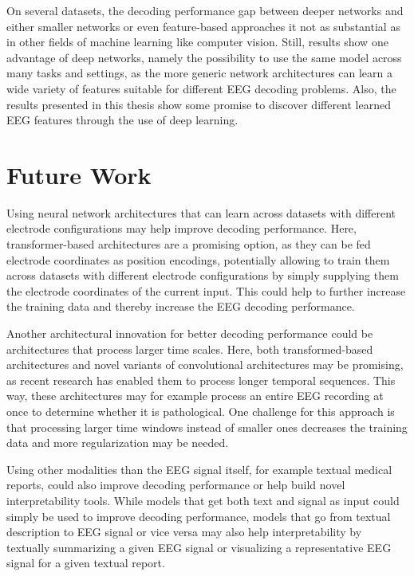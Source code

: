 On several datasets, the decoding performance gap between deeper
networks and either smaller networks or even feature-based approaches it
not as substantial as in other fields of machine learning like computer
vision. Still, results show one advantage of deep networks, namely the
possibility to use the same model across many tasks and settings, as the
more generic network architectures can learn a wide variety of features
suitable for different EEG decoding problems. Also, the results
presented in this thesis show some promise to discover different learned
EEG features through the use of deep learning.


\section{Future Work}\label{future-work}

Using neural network architectures that can learn across datasets with
different electrode configurations may help improve decoding
performance. Here, transformer-based architectures
\citep{DBLP:conf/nips/VaswaniSPUJGKP17} are a promising
option, as they can be fed electrode coordinates as position encodings,
potentially allowing to train them across datasets with different
electrode configurations by simply supplying them the electrode
coordinates of the current input. This could help to further increase
the training data and thereby increase the EEG decoding performance.

Another architectural innovation for better decoding performance could
be architectures that process larger time scales. Here, both
transformed-based architectures
\citep{bigbird,etc,DBLP:journals/corr/abs-2004-05150,longt5,DBLP:journals/tacl/RoySVG21,block_recurrent_transformers,DBLP:conf/nips/DaoFERR22}
and novel variants of convolutional architectures
\citep{DBLP:journals/corr/abs-2302-06646,DBLP:journals/corr/abs-2302-10866}
may be promising, as recent research has enabled them to process longer
temporal sequences. This way, these architectures may for example process
an entire EEG recording at once to determine whether it is
pathological. One challenge for this approach is that processing larger
time windows instead of smaller ones decreases the training data 
and more regularization may be needed.

Using other modalities than the EEG signal itself, for example textual medical reports, could also improve decoding performance or help build novel interpretability tools. While models that get both text and signal as input could simply be used to improve decoding performance, models that go from textual description to EEG signal or
vice versa \cite{pmlr-v106-biswal19a,de2022learning} may also
help interpretability by textually summarizing a given EEG signal or
visualizing a representative EEG signal for a given textual
report.

